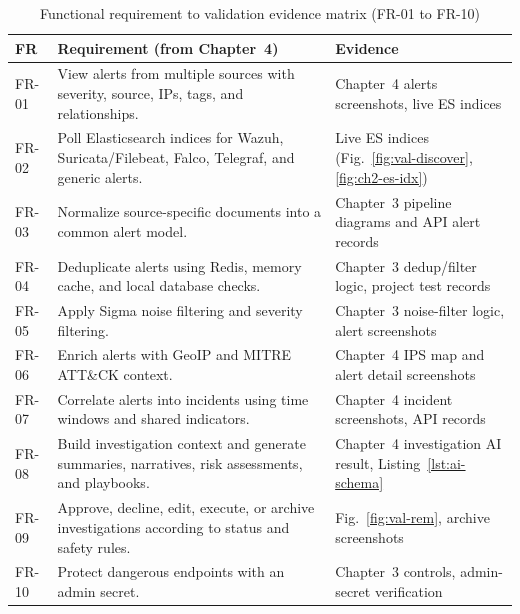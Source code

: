 \begin{table}[H]
\centering
\caption{Functional requirement to validation evidence matrix (FR-01 to FR-10)}
\label{tab:fr-matrix-a}
\begin{tabularx}{\textwidth}{@{}p{}p{}X@{}}
\toprule
\textbf{FR} & \textbf{Requirement (from Chapter~4)} & \textbf{Evidence} \\
\midrule
FR-01 & View alerts from multiple sources with severity, source, IPs, tags, and relationships. & Chapter~4 alerts screenshots, live ES indices \\
FR-02 & Poll Elasticsearch indices for Wazuh, Suricata/Filebeat, Falco, Telegraf, and generic alerts. & Live ES indices (Fig.~\ref{fig:val-discover}, \ref{fig:ch2-es-idx}) \\
FR-03 & Normalize source-specific documents into a common alert model. & Chapter~3 pipeline diagrams and API alert records \\
FR-04 & Deduplicate alerts using Redis, memory cache, and local database checks. & Chapter~3 dedup/filter logic, project test records \\
FR-05 & Apply Sigma noise filtering and severity filtering. & Chapter~3 noise-filter logic, alert screenshots \\
FR-06 & Enrich alerts with GeoIP and MITRE ATT\&CK context. & Chapter~4 IPS map and alert detail screenshots \\
FR-07 & Correlate alerts into incidents using time windows and shared indicators. & Chapter~4 incident screenshots, API records \\
FR-08 & Build investigation context and generate summaries, narratives, risk assessments, and playbooks. & Chapter~4 investigation AI result, Listing~\ref{lst:ai-schema} \\
FR-09 & Approve, decline, edit, execute, or archive investigations according to status and safety rules. & Fig.~\ref{fig:val-rem}, archive screenshots \\
FR-10 & Protect dangerous endpoints with an admin secret. & Chapter~3 controls, admin-secret verification \\
\bottomrule
\end{tabularx}
\end{table}

